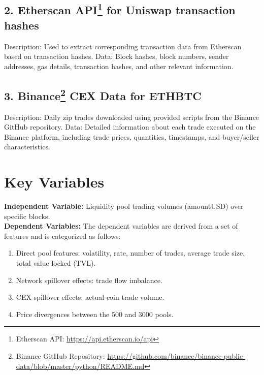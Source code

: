 \documentclass{article}
\begin{document}
{\subsection*{2. Etherscan API\footnote{Etherscan API: \url{https://api.etherscan.io/api}} for Uniswap transaction hashes}
Description: Used to extract corresponding transaction data from Etherscan based on transaction hashes.
Data: Block hashes, block numbers, sender addresses, gas details, transaction hashes, and other relevant information.

\subsection*{3. Binance\footnote{Binance GitHub Repository: \url{https://github.com/binance/binance-public-data/blob/master/python/README.md}} CEX Data for ETHBTC}
\begin{minipage}[t]{0.78\textwidth}
Description: Daily zip trades downloaded using provided scripts from the Binance GitHub repository.
Data: Detailed information about each trade executed on the Binance platform, including trade prices, quantities, timestamps, and buyer/seller characteristics.
\end{minipage}

\section*{Key Variables}
\textbf{Independent Variable:} Liquidity pool trading volumes (amountUSD) over specific blocks.\\

\textbf{Dependent Variables:}
The dependent variables are derived from a set of features and is categorized as follows:
\begin{enumerate}[label=\arabic*. ,itemsep=0pt, topsep=0pt]
\item Direct pool features: volatility, rate, number of trades, average trade size, total value locked (TVL).
\item Network spillover effects: trade flow imbalance.
\item CEX spillover effects: actual coin trade volume.
\item Price divergences between the 500 and 3000 pools.
\end{enumerate}

}
\end{document}
